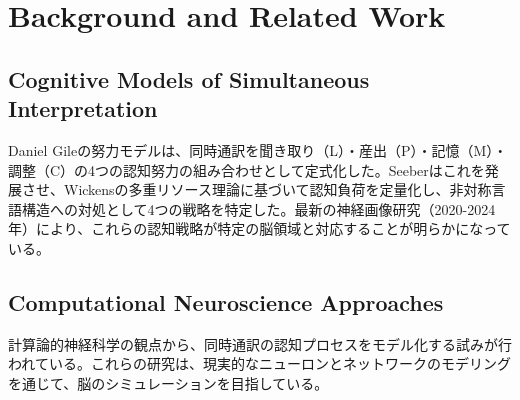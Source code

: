 \section{Background and Related Work}

\subsection{Cognitive Models of Simultaneous Interpretation}

Daniel Gileの努力モデルは、同時通訳を聞き取り（L）・産出（P）・記憶（M）・調整（C）の4つの認知努力の組み合わせとして定式化した。Seeberはこれを発展させ、Wickensの多重リソース理論に基づいて認知負荷を定量化し、非対称言語構造への対処として4つの戦略を特定した。最新の神経画像研究（2020-2024年）により、これらの認知戦略が特定の脳領域と対応することが明らかになっている\cite{ishizuka2024two}。

\subsection{Computational Neuroscience Approaches}

計算論的神経科学の観点から、同時通訳の認知プロセスをモデル化する試みが行われている\cite{dangelo2013realistic}。これらの研究は、現実的なニューロンとネットワークのモデリングを通じて、脳のシミュレーションを目指している\cite{mcdougal2016reproducibility}。
